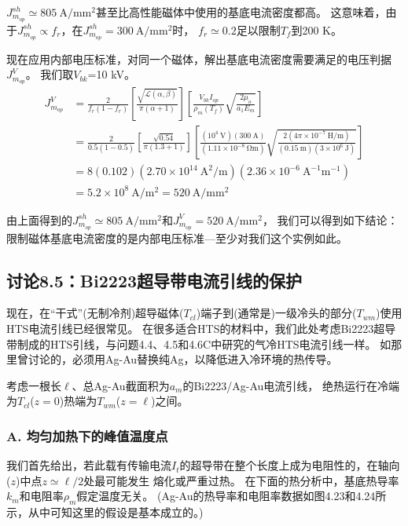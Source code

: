 $J_{m_{op}}^{sh}\simeq 805\ \mathrm{ A/mm^2}$甚至比高性能磁体中使用的基底电流密度都高。
这意味着，由于$J_{m_{op}}^{sh}\propto f_r$，在$J_{m_{op}}^{sh}=300\ \mathrm{ A/mm^2}$时，
$f_r\simeq 0.2$足以限制$T_f$到200 K。

现在应用内部电压标准，对同一个磁体，解出基底电流密度需要满足的电压判据$J_{m_{op}}^V$。
我们取$V_{bk}$=10 kV。
\begin{align*}%
J_{m_{op}}^{V}&=\frac{2}{f_r(1-f_r)}\left[\frac{\sqrt{\mathcal{L}(\alpha,\beta)}}{\pi(\alpha+1)}\right]\left[\frac{V_{bk}I_{op}}{\rho_m(T_f)}\sqrt{\frac{2\mu_o}{a_1E_m}}\right] \\ \tag{8.40b}
&=\frac{2}{0.5(1-0.5)}\left[\frac{\sqrt{0.54}}{\pi(1.3+1)}\right]\left[\frac{(10^4\ \mathrm{V})(300\ \mathrm{A})}{(1.11\times 10^{-8}\ \mathrm{\Omega m})}\sqrt{\frac{2(4\pi\times 10^{-7}\ \mathrm{H/m})}{(0.15\ \mathrm{m})(3\times 10^6\ \mathrm{J})}}\right] \\
&=8(0.102)(2.70\times 10^{14}\ \mathrm{A^2/m})(2.36\times 10^{-6}\ \mathrm{A^{-1}m^{-1}}) \\
&=5.2\times 10^8\ \mathrm{A/m^2}=520\ \mathrm{A/mm^2}
\end{align*}

由上面得到的$J_{m_{op}}^{sh}\simeq 805\ \mathrm{ A/mm^2}$和$J_{m_{op}}^{V}=520\ \mathrm{A/mm^2}$，
我们可以得到如下结论：
限制磁体基底电流密度的是内部电压标准---至少对我们这个实例如此。


\subsection{讨论8.5：Bi2223超导带电流引线的保护}
现在，在“干式”(无制冷剂)超导磁体($T_{cl}$)端子到(通常是)一级冷头的部分($T_{wm}$)使用HTS电流引线已经很常见。
在很多适合HTS的材料中，我们此处考虑Bi2223超导带制成的HTS引线，与问题4.4、4.5和4.6C中研究的气冷HTS电流引线一样。
如那里曾讨论的，必须用Ag-Au替换纯Ag，以降低进入冷环境的热传导。

考虑一根长$\ell$、总Ag-Au截面积为$a_m$的Bi2223/Ag-Au电流引线，
绝热运行在冷端为$T_{cl}$($z=0$)热端为$T_{wm}$($z=\ell$)之间。

\subsubsection*{A. 均匀加热下的峰值温度点}
我们首先给出，若此载有传输电流$I_t$的超导带在整个长度上成为电阻性的，在轴向($z$)中点$z\simeq\ell/2$处最可能发生
熔化或严重过热。
在下面的热分析中，基底热导率$k_m$和电阻率$\rho_m$假定温度无关。
(Ag-Au的热导率和电阻率数据如图4.23和4.24所示，从中可知这里的假设是基本成立的。)

